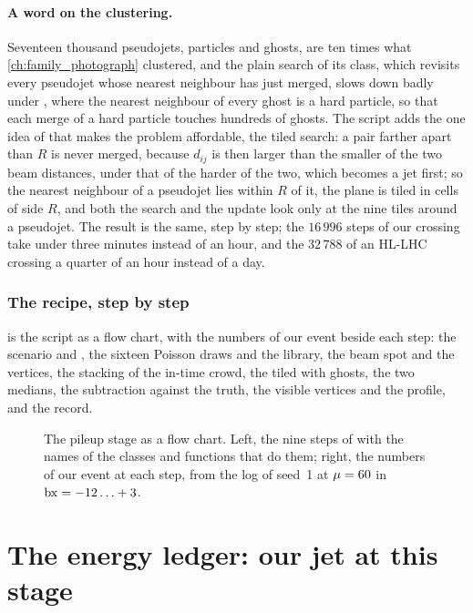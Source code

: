 \paragraph{A word on the clustering.}
Seventeen thousand pseudojets, particles and ghosts, are ten times what
\cref{ch:family_photograph} clustered, and the plain search of its
 class, which revisits every pseudojet whose nearest
neighbour has just merged, slows down badly under \antikt, where the
nearest neighbour of every ghost is a hard particle, so that each merge
of a hard particle touches hundreds of ghosts. The script adds the one
idea of \FASTJET that makes the problem affordable, the tiled search: a
pair farther apart than $R$ is never merged, because $d_{ij}$ is then
larger than the smaller of the two beam distances, under \antikt that of
the harder of the two, which becomes a jet first; so the nearest neighbour of a pseudojet lies within $R$ of it,
the plane is tiled in cells of side $R$, and both the search and the
update look only at the nine tiles around a pseudojet. The result is the
same, step by step; the $16\,996$ steps of our crossing take under three minutes
instead of an hour, and the $32\,788$ of an HL-LHC crossing a quarter of
an hour instead of a day.

\subsubsection{The recipe, step by step}
\label{sec:crowd_on_the_road:recipe}
 is the script as a flow chart, with the
numbers of our event beside each step: the scenario and \mup, the sixteen
Poisson draws and the library, the beam spot and the vertices, the
stacking of the in-time crowd, the tiled \antikt with ghosts, the two
medians, the subtraction against the truth, the visible vertices and the
profile, and the record.

\begin{figure}[htbp]\centering
\resizebox{\textwidth}{!}{}
\caption[The pileup stage as a flow chart, with the numbers of our
event]{The pileup stage as a flow chart. Left, the nine steps of
 with the names of the classes and functions
that do them; right, the numbers of our event at each step, from the
 log of seed~1 at $\mu=60$ in $\mathrm{bx}=-12\ldots+3$.}
\label{fig:crowd_on_the_road:flow}
\end{figure}

\section{The energy ledger: our jet at this stage}
\label{sec:crowd_on_the_road:our_jet_at_this_stage_how_much_pileup_en}

